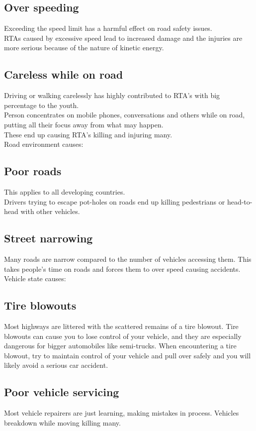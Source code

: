 \documentclass[12pt]{article}
\begin{document}
\subsection{Over speeding}
Exceeding the speed limit has a harmful effect on road safety issues.\\ RTAs  caused 
by excessive speed lead to increased damage and the injuries are more serious because of 
the nature of kinetic energy.
\subsection{Careless while on road}
Driving or walking carelessly has highly contributed to RTA's with big percentage to the youth.\\ Person concentrates on mobile phones, conversations and others while on road, putting all their focus away from what may happen.\\ These end up causing RTA's killing and injuring many.
\\
Road environment causes:
\subsection{Poor roads}
This applies to all developing countries.\\
Drivers trying to escape pot-holes on roads end up killing pedestrians or head-to-head with other vehicles.\\
\subsection{Street narrowing}
Many roads are narrow compared to the number of vehicles accessing them. This takes people's time on roads and forces them to over speed causing accidents.\\
Vehicle state causes:
\subsection{Tire blowouts}
Most highways are littered with the scattered remains of a tire blowout. Tire blowouts can cause you to lose control of your vehicle, and they are especially dangerous for bigger automobiles like semi-trucks. When encountering a tire blowout, try to maintain control of your vehicle and pull over safely and you will likely avoid a serious car accident.
\subsection{Poor vehicle servicing}
Most vehicle repairers are just learning, making mistakes in process. Vehicles breakdown while moving killing many. 
\end{document}
